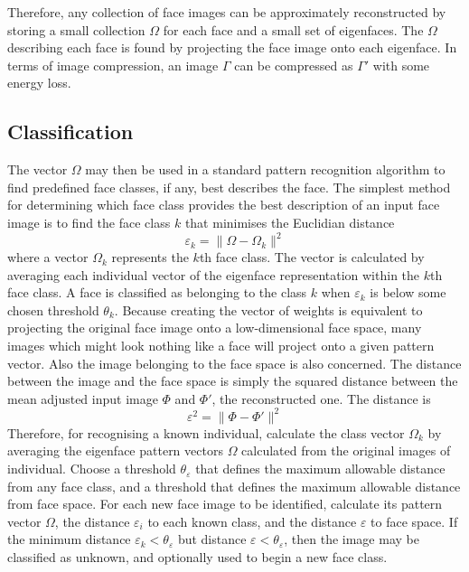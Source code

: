 Therefore, any collection of face images can be approximately reconstructed by storing a small collection $\Omega$ for each face and a small set of eigenfaces. The $\Omega$ describing each face is found by projecting the face image onto each eigenface. In terms of image compression, an image $\Gamma$ can be compressed as $\Gamma'$ with some energy loss.

\subsection{Classification}
The vector $\Omega$ may then be used in a standard pattern recognition algorithm to find predefined face classes, if any, best describes the face. The simplest method for determining which face class provides the best description of an input face image is to find the face class $k$ that minimises the Euclidian distance
\begin{equation}
 \varepsilon_k = \|\Omega-\Omega_k\|^2
\end{equation}
where a vector $\Omega_k$ represents the $k$th face class. The vector is calculated by averaging each individual vector of the eigenface representation within the $k$th face class. A face is classified as belonging to the class $k$ when $\varepsilon_k$ is below some chosen threshold $\theta_k$. Because creating the vector of weights is equivalent to projecting the original face image onto a low-dimensional face space, many images which might look nothing like a face will project onto a given pattern vector. Also the image belonging to the face space is also concerned. The distance between the image and the face space is simply the squared distance between the mean adjusted input image $\Phi$ and $\Phi'$, the reconstructed one. The distance is
\begin{equation}
 \varepsilon^2 = \|\Phi-\Phi' \|^2
\end{equation}
Therefore, for recognising a known individual, calculate the class vector $\Omega_k$ by averaging the eigenface pattern vectors $\Omega$ calculated from the original images of individual. Choose a threshold $\theta_{\varepsilon}$ that defines the maximum allowable distance from any face class, and a threshold that defines the maximum allowable distance from face space. For each new face image to be identified, calculate its pattern vector $\Omega$, the distance $\varepsilon_i$ to each known class, and the distance $\varepsilon$ to face space. If the minimum distance $\varepsilon_k < \theta_{\varepsilon}$ but distance $\varepsilon < \theta_{\varepsilon}$, then the image may be classified as unknown, and optionally used to begin a new face class.

